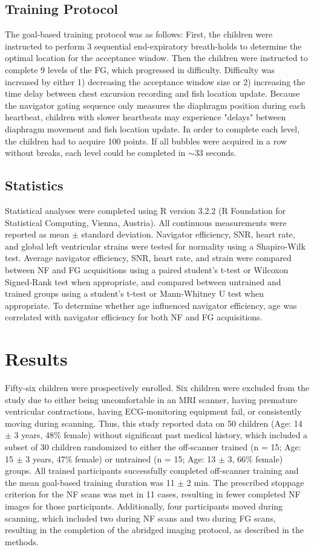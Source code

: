 \subsection{Training Protocol}
	The goal-based training protocol was as follows: First, the children were instructed to perform 3 sequential end-expiratory breath-holds to determine the optimal location for the acceptance window. Then the children were instructed to complete 9 levels of the FG, which progressed in difficulty. Difficulty was increased by either 1) decreasing the acceptance window size or 2) increasing the time delay between chest excursion recording and fish location update. Because the navigator gating sequence only measures the diaphragm position during each heartbeat, children with slower heartbeats may experience "delays" between diaphragm movement and fish location update. In order to complete each level, the children had to acquire 100 points. If all bubbles were acquired in a row without breaks, each level could be completed in $\sim$33 seconds.

\subsection{Statistics}
	Statistical analyses were completed using R version 3.2.2 (R Foundation for Statistical Computing, Vienna, Austria). All continuous measurements were reported as mean $\pm$ standard deviation. Navigator efficiency, SNR, heart rate, and global left ventricular strains were tested for normality using a Shapiro-Wilk test. Average navigator efficiency, SNR, heart rate, and strain were compared between NF and FG acquisitions using a paired student's t-test or Wilcoxon Signed-Rank test when appropriate, and compared between untrained and trained groups using a student's t-test or Mann-Whitney U test when appropriate. To determine whether age influenced navigator efficiency, age was correlated with navigator efficiency for both NF and FG acquisitions.
	
\section{Results}
	Fifty-six children were prospectively enrolled. Six children were excluded from the study due to either being uncomfortable in an MRI scanner, having premature ventricular contractions, having ECG-monitoring equipment fail, or consistently moving during scanning. Thus, this study reported data on 50 children (Age: 14 $\pm$ 3 years, 48\% female) without significant past medical history, which included a subset of 30 children randomized to either the off-scanner trained (n = 15; Age: 15 $\pm$ 3 years, 47\% female) or untrained (n = 15; Age: 13 $\pm$ 3, 66\% female) groups. All trained participants successfully completed off-scanner training and the mean goal-based training duration was 11 $\pm$ 2 min. The prescribed stoppage criterion for the NF scans was met in 11 cases, resulting in fewer completed NF images for those participants. Additionally, four participants moved during scanning, which included two during NF scans and two during FG scans, resulting in the completion of the abridged imaging protocol, as described in the methods.

